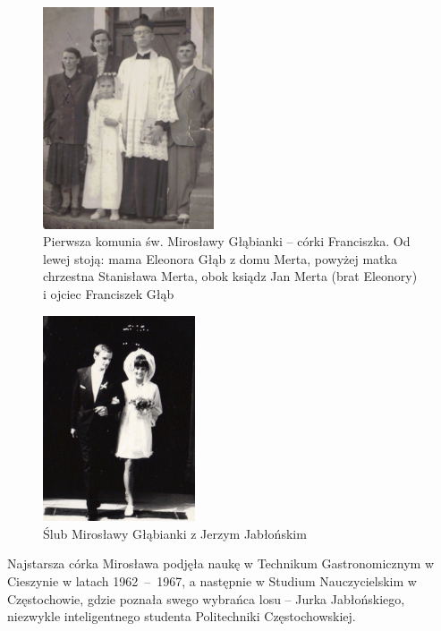 \begin{figure}[!h]
\begin{center}
\includegraphics[width=0.45\textwidth]{zdjecia/pierwsza_komunia_miroslawy_glab.jpg}
\caption[Pierwsza komunia św. Mirosławy Głąbianki]{Pierwsza komunia św. Mirosławy Głąbianki -- córki Franciszka. Od lewej stoją: mama Eleonora Głąb z domu Merta, powyżej matka chrzestna Stanisława Merta, obok ksiądz Jan Merta (brat Eleonory) i ojciec Franciszek Głąb}
\label{rys:pierwsza_komunia_miroslawy_glab}
\end{center}
\end{figure}

\begin{figure}[!hb]
\begin{center}
\includegraphics[width=0.4\textwidth]{zdjecia/slub_jerzego_i_miroslawy_jablonskich.jpg}
\caption{Ślub Mirosławy Głąbianki z Jerzym Jabłońskim}
\label{rys:slub_jerzego_i_miroslawy_jablonskich}
\end{center}
\end{figure}

Najstarsza córka Mirosława podjęła naukę w Technikum Gastronomicznym w Cieszynie w latach 1962~--~1967, a następnie w Studium Nauczycielskim w Częstochowie, gdzie poznała swego wybrańca losu -- Jurka Jabłońskiego, niezwykle inteligentnego studenta Politechniki Częstochowskiej.

